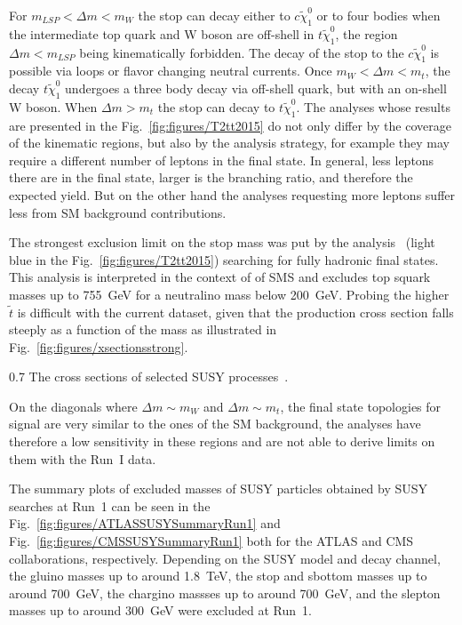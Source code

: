 For $m_{LSP} < \Delta m < m_{W}$ the stop can decay either to $c \tilde{\chi}_{1}^0$ or to four bodies when the intermediate top quark and W boson are off-shell in $t \tilde{\chi}_{1}^0$, the region $\Delta m < m_{LSP}$ being kinematically forbidden. The decay of the stop to the $c \tilde{\chi}_{1}^0$ is possible via loops or flavor changing neutral currents. Once $m_{W} < \Delta m < m_{t}$, the decay $t \tilde{\chi}_{1}^0$ undergoes a three body decay via off-shell quark, but with an on-shell W boson. When $\Delta m > m_{t}$ the stop can decay to $t \tilde{\chi}_{1}^0$. The analyses whose results are presented in the Fig.~\ref{fig:figures/T2tt2015} do not only differ by the coverage of the kinematic regions, but also by the analysis strategy, for example they may require a different number of leptons in the final state. In general, less leptons there are in the final state, larger is the branching ratio, and therefore the expected yield. But on the other hand the analyses requesting more leptons suffer less from SM background contributions.  

The strongest exclusion limit on the stop mass was put by the analysis~\cite{Khachatryan:2016oia} (light blue in the Fig.~\ref{fig:figures/T2tt2015}) searching for fully hadronic final states. This analysis is interpreted in the context of of SMS and excludes top squark masses up to 755~GeV for a neutralino mass  below 200~GeV. Probing the higher $\tilde{t}$ is difficult with the current dataset, given that the production cross section falls steeply as a function of the mass as illustrated in Fig.~\ref{fig:figures/xsectionsstrong}.
 
                 {0.7}       %
                 { The cross sections of selected SUSY processes~\cite{website:LHCxsec}. }


On the diagonals where $\Delta m \sim m_{W}$ and $\Delta m \sim m_{t}$, the final state topologies for signal are very similar to the ones of the SM background, the analyses have therefore a low sensitivity in these regions and are not able to derive limits on them with the Run~I data.

The summary plots of excluded masses of SUSY particles obtained by SUSY searches at Run~1 can be seen in the Fig.~\ref{fig:figures/ATLASSUSYSummaryRun1} and Fig.~\ref{fig:figures/CMSSUSYSummaryRun1} both for the ATLAS and CMS collaborations, respectively. Depending on the SUSY model and decay channel, the gluino masses up to around 1.8~TeV, the stop and sbottom masses up to around 700~GeV, the chargino massses up to around 700~GeV, and the slepton masses up to around 300~GeV were excluded at Run~1. 


